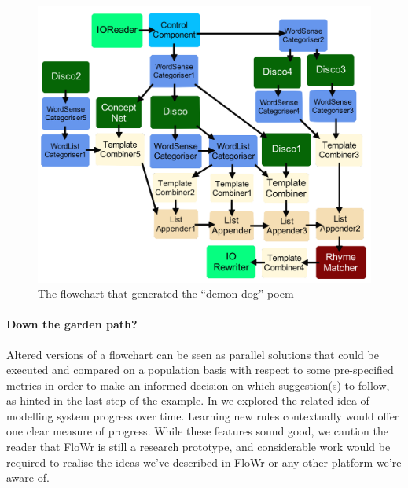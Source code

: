 \begin{figure}[t]
\begin{center}
\includegraphics[width=\columnwidth]{./figures/PoemsFlowchart.png}
\caption{The flowchart that generated the ``demon dog'' poem}
\label{poetryGeneratorFlowchart}
\end{center}
\end{figure}

\paragraph{Down the garden path?}
Altered versions of a flowchart \cite{charnley2014flowr} can be seen as parallel solutions that could be executed and compared on a population basis with respect to some pre-specified metrics in order to make an informed decision on which suggestion(s) to follow, as hinted in the last step of the example.  In \cite{colton-assessingprogress} we explored the related idea of modelling system progress over time.  Learning new rules contextually would offer one clear measure of progress.  While these features sound good, we caution the reader that FloWr is still a research prototype, and considerable work would be required to realise the ideas we've described in FloWr or any other platform we're aware of.

